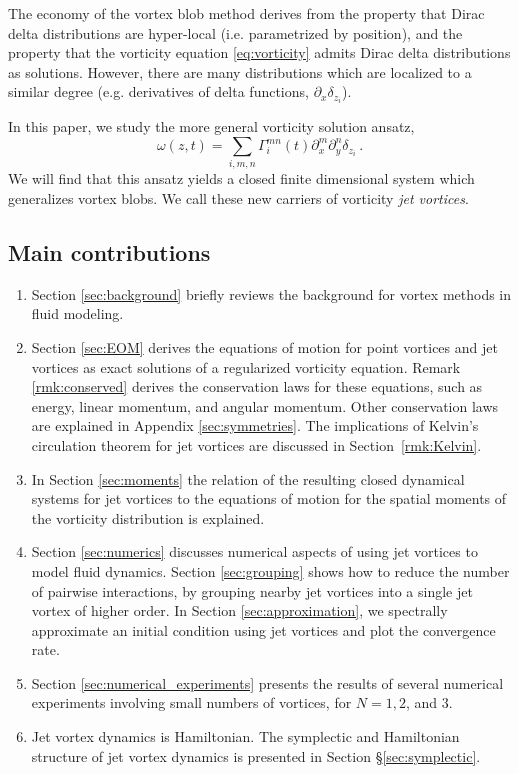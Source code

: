 \documentclass[12pt]{amsart}
\theoremstyle{remark}
\begin{document}
The economy of the vortex blob method derives from the property that Dirac delta distributions are hyper-local (i.e. parametrized by position), and the property that the vorticity equation  \eqref{eq:vorticity} admits Dirac delta distributions as solutions.
However, there are many distributions which are localized to a similar degree (e.g. derivatives of delta functions, $\partial_x \delta_{z_i}$).

In this paper, we study the more general vorticity solution ansatz,
\[\omega(z,t) = \sum_{i,m,n} \Gamma_i^{mn}(t) \partial_x^m \partial_y^n \delta_{z_i}\,.\]
We will find that this ansatz yields a closed finite dimensional system which generalizes vortex blobs. We call these new carriers of vorticity \emph{jet vortices}.

\subsection{Main contributions}
\begin{enumerate}
        \item Section \ref{sec:background} briefly reviews the background for vortex methods in fluid modeling.
        \item Section \ref{sec:EOM} derives the equations of motion for point vortices and jet vortices as exact solutions of a regularized vorticity equation. Remark \ref{rmk:conserved} derives the conservation laws for these equations, such as energy, linear momentum, and angular momentum. Other conservation laws are explained in Appendix \ref{sec:symmetries}. The implications of Kelvin's circulation theorem for jet vortices are discussed in Section~\ref{rmk:Kelvin}.
        \item In Section \ref{sec:moments} the relation of the resulting closed dynamical systems for jet vortices to the equations of motion for the spatial moments of the vorticity distribution is explained.
        \item Section \ref{sec:numerics} discusses numerical aspects of using jet vortices to model fluid dynamics. Section \ref{sec:grouping} shows how to reduce the number of pairwise interactions, by grouping nearby jet vortices into a single jet vortex of higher order. In Section \ref{sec:approximation}, we spectrally approximate an initial condition using jet vortices and plot the convergence rate. 
        \item   Section \ref{sec:numerical_experiments} presents the results of several numerical experiments involving small numbers of vortices, for $N=1,2$, and $3$.
        	\item Jet vortex dynamics is Hamiltonian. The symplectic and Hamiltonian structure of jet vortex dynamics is presented in Section \S \ref{sec:symplectic}.
\end{enumerate}
\end{document}
